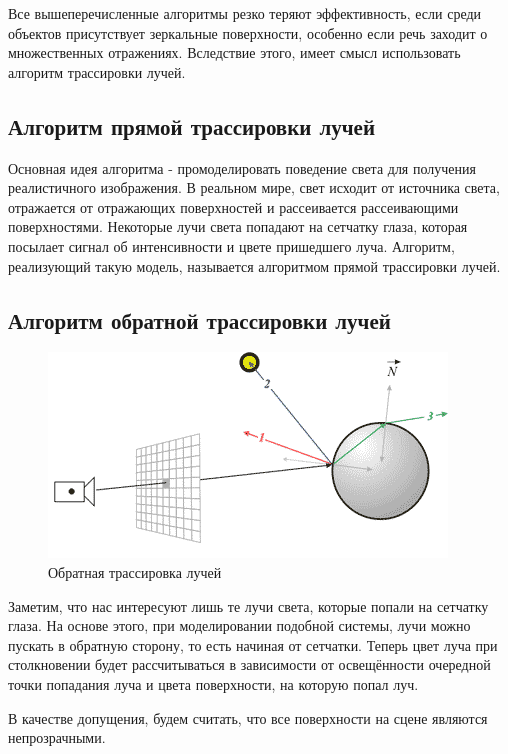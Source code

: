 \documentclass[a4paper, 14pt]{report} %
\begin{document}
	Все вышеперечисленные алгоритмы резко теряют эффективность, если среди объектов присутствует зеркальные поверхности, особенно если речь заходит о множественных отражениях. Вследствие этого, имеет смысл использовать алгоритм трассировки лучей.
	
	\subsection{Алгоритм прямой трассировки лучей}
	Основная идея алгоритма - промоделировать поведение света для получения реалистичного изображения. В реальном мире, свет исходит от источника света, отражается от отражающих поверхностей и рассеивается рассеивающими поверхностями. Некоторые лучи света попадают на сетчатку глаза, которая посылает сигнал об интенсивности и цвете пришедшего луча. Алгоритм, реализующий такую модель, называется алгоритмом прямой трассировки лучей.
	
	\subsection{Алгоритм обратной трассировки лучей}
	\begin{figure}[ht]
		\centering
		\includegraphics[width=1\linewidth]{backward_ray_trace}
		\caption{Обратная трассировка лучей}
		\label{fig:backward_ray_trace}
	\end{figure}

	Заметим, что нас интересуют лишь те лучи света, которые попали на сетчатку глаза. На основе этого, при моделировании подобной системы, лучи можно пускать в обратную сторону, то есть начиная от сетчатки. Теперь цвет луча при столкновении будет рассчитываться в зависимости от освещённости очередной точки попадания луча и цвета поверхности, на которую попал луч.
	
	В качестве допущения, будем считать, что все поверхности на сцене являются непрозрачными.
	
\end{document}
